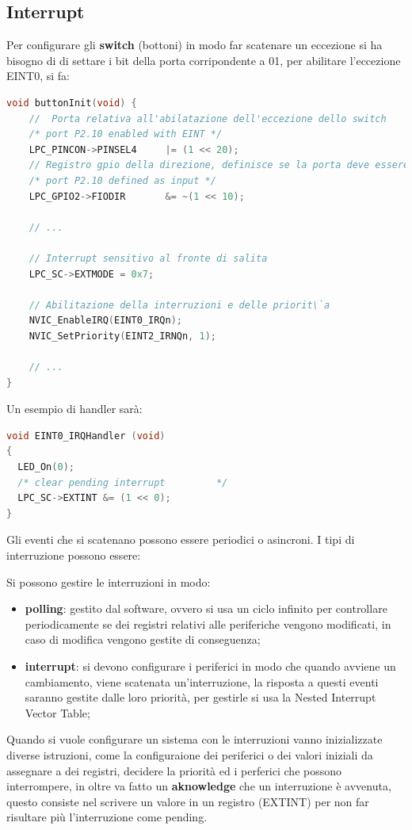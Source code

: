 \documentclass[12pt]{article}
\begin{document}
\subsection{Interrupt}
Per configurare gli \textbf{switch} (bottoni) in modo far scatenare un eccezione si ha bisogno di di settare i bit della porta corripondente a 01, per abilitare l'eccezione EINT0, si fa:
\begin{lstlisting}[language=C]
void buttonInit(void) {
    //  Porta relativa all'abilatazione dell'eccezione dello switch 
    /* port P2.10 enabled with EINT */
    LPC_PINCON->PINSEL4     |= (1 << 20);
    // Registro gpio della direzione, definisce se la porta deve essere in input o in output
    /* port P2.10 defined as input */
    LPC_GPIO2->FIODIR       &= ~(1 << 10);

    // ...

    // Interrupt sensitivo al fronte di salita
    LPC_SC->EXTMODE = 0x7;

    // Abilitazione della interruzioni e delle priorit\`a
    NVIC_EnableIRQ(EINT0_IRQn);
    NVIC_SetPriority(EINT2_IRNQn, 1);
    
    // ...
}
\end{lstlisting}
Un esempio di handler sar\`a:
\begin{lstlisting}[language=C]
void EINT0_IRQHandler (void)	  
{
  LED_On(0);
  /* clear pending interrupt         */
  LPC_SC->EXTINT &= (1 << 0);     
}
\end{lstlisting}


Gli eventi che si scatenano possono essere periodici o asincroni. I tipi di interruzione possono essere: 

Si possono gestire le interruzioni in modo:
\begin{itemize}
    \item \textbf{polling}: gestito dal software, ovvero si usa un ciclo infinito per controllare periodicamente se dei registri relativi alle periferiche vengono modificati, in caso di modifica vengono gestite di conseguenza;
    \item \textbf{interrupt}: si devono configurare i periferici in modo che quando avviene un cambiamento, viene scatenata un'interruzione, la risposta a questi eventi saranno gestite dalle loro priorit\`a, per gestirle si usa la Nested Interrupt Vector Table;
\end{itemize}
Quando si vuole configurare un sistema con le interruzioni vanno inizializzate diverse istruzioni, come la configuraione dei periferici o dei valori iniziali da assegnare a dei registri, decidere la priorit\`a ed i perferici che possono interrompere, in oltre va fatto un \textbf{aknowledge} che un interruzione \`e avvenuta, questo consiste nel scrivere un valore in un registro (EXTINT) per non far risultare pi\`u l'interruzione come pending.
\end{document}
